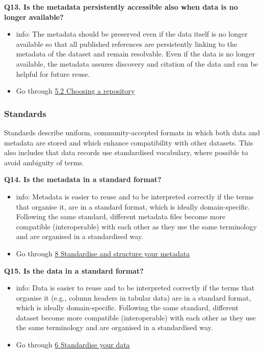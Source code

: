 \documentclass[
]{book}
\providecommand{\tightlist}{%
  \setlength{\itemsep}{0pt}\setlength{\parskip}{0pt}}
\begin{document}
\textbf{Q13. Is the metadata persistently accessible also when data is no longer available?}

\begin{itemize}
\tightlist
\item
  info: The metadata should be preserved even if the data itself is no longer available so that all published references are persistently linking to the metadata of the dataset and remain resolvable. Even if the data is no longer available, the metadata assures discovery and citation of the data and can be helpful for future reuse.
\item
  Go through \protect\hyperlink{choosing-a-repository}{5.2 Choosing a repository}
\end{itemize}

\hypertarget{standards}{%
\subsubsection*{Standards}\label{standards}}

Standards describe uniform, community-accepted formats in which both data and metadata are stored and which enhance compatibility with other datasets. This also includes that data records use standardised vocabulary, where possible to avoid ambiguity of terms.

\textbf{Q14. Is the metadata in a standard format?}

\begin{itemize}
\tightlist
\item
  info: Metadata is easier to reuse and to be interpreted correctly if the terms that organise it, are in a standard format, which is ideally domain-specific. Following the same standard, different metadata files become more compatible (interoperable) with each other as they use the same terminology and are organised in a standardised way.
\item
  Go through \protect\hyperlink{standardise-and-structure-your-metadata}{8 Standardise and structure your metadata}
\end{itemize}

\textbf{Q15. Is the data in a standard format?}

\begin{itemize}
\tightlist
\item
  info: Data is easier to reuse and to be interpreted correctly if the terms that organise it (e.g., column headers in tabular data) are in a standard format, which is ideally domain-specific. Following the same standard, different dataset become more compatible (interoperable) with each other as they use the same terminology and are organised in a standardised way.
\item
  Go through \protect\hyperlink{standardise-your-data}{6 Standardise your data}
\end{itemize}
\end{document}
